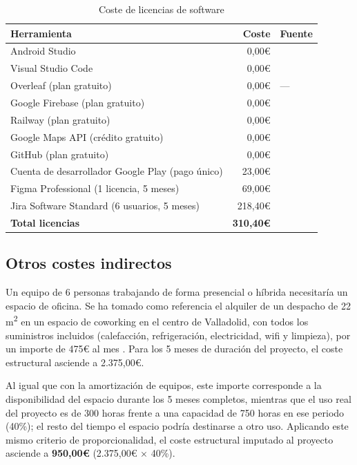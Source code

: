 \begin{table}[ht!]
\centering
\begin{tabular}{|l|r|l|}
\hline
\textbf{Herramienta} & \textbf{Coste} & \textbf{Fuente} \\
\hline
Android Studio & 0,00€ & \cite{androidstudio} \\
\hline
Visual Studio Code & 0,00€ & \cite{vscode} \\
\hline
Overleaf (plan gratuito) & 0,00€ & --- \\
\hline
Google Firebase (plan gratuito) & 0,00€ & \cite{firebasefcm} \\
\hline
Railway (plan gratuito) & 0,00€ & \cite{railwaypricing} \\
\hline
Google Maps API (crédito gratuito) & 0,00€ & \cite{googlemapsapi} \\
\hline
GitHub (plan gratuito) & 0,00€ & \cite{github} \\
\hline
Cuenta de desarrollador Google Play (pago único) & 23,00€ & \cite{googlePlayFee} \\
\hline
Figma Professional (1 licencia, 5 meses) & 69,00€ & \cite{figmaPricing} \\
\hline
Jira Software Standard (6 usuarios, 5 meses) & 218,40€ & \cite{jiraPricing} \\
\hline
\textbf{Total licencias} & \textbf{310,40€} & \\
\hline
\end{tabular}
\caption{Coste de licencias de software}
\label{tab:licencias}
\end{table}

\subsection{Otros costes indirectos}

Un equipo de 6 personas trabajando de forma presencial o híbrida necesitaría un espacio de oficina. Se ha tomado como referencia el alquiler de un despacho de 22 m\textsuperscript{2} en un espacio de coworking en el centro de Valladolid, con todos los suministros incluidos (calefacción, refrigeración, electricidad, wifi y limpieza), por un importe de 475€ al mes \cite{oficinaValladolid}. Para los 5 meses de duración del proyecto, el coste estructural asciende a 2.375,00€.

Al igual que con la amortización de equipos, este importe corresponde a la disponibilidad del espacio durante los 5 meses completos, mientras que el uso real del proyecto es de 300 horas frente a una capacidad de 750 horas en ese periodo (40\%); el resto del tiempo el espacio podría destinarse a otro uso. Aplicando este mismo criterio de proporcionalidad, el coste estructural imputado al proyecto asciende a \textbf{950,00€} (2.375,00€ × 40\%).

